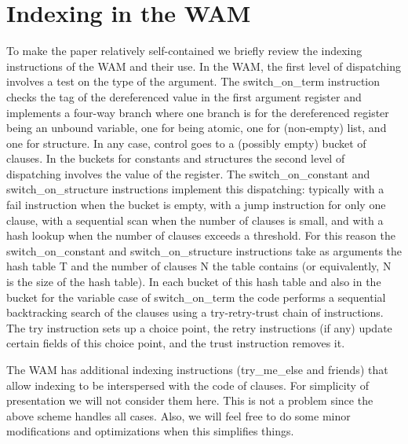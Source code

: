 \documentclass{llncs}
\newcommand{\instr}[1]{\textsf{#1}}
\newcommand{\try}{\instr{try}\xspace}
\newcommand{\retry}{\mbox{\instr{retry}}\xspace}
\newcommand{\trust}{\instr{trust}\xspace}
\newcommand{\TryRetryTrust}{\mbox{\instr{try-retry-trust}}\xspace}
\newcommand{\fail}{\instr{fail}\xspace}
\newcommand{\jump}{\instr{jump}\xspace}
\newcommand{\switchONterm}{\mbox{\instr{switch\_on\_term}}\xspace}
\newcommand{\switchONconstant}{\mbox{\instr{switch\_on\_constant}}\xspace}
\newcommand{\switchONstructure}{\mbox{\instr{switch\_on\_structure}}\xspace}
\begin{document}
\section{Indexing in the WAM} \label{sec:prelims}
To make the paper relatively self-contained we briefly review the
indexing instructions of the WAM and their use. In the WAM, the first
level of dispatching involves a test on the type of the argument. The
\switchONterm instruction checks the tag of the dereferenced value in
the first argument register and implements a four-way branch where one
branch is for the dereferenced register being an unbound variable, one
for being atomic, one for (non-empty) list, and one for structure. In
any case, control goes to a (possibly empty) bucket of clauses. In the
buckets for constants and structures the second level of dispatching
involves the value of the register. The \switchONconstant and
\switchONstructure instructions implement this dispatching: typically
with a \fail instruction when the bucket is empty, with a \jump
instruction for only one clause, with a sequential scan when the
number of clauses is small, and with a hash lookup when the number of
clauses exceeds a threshold. For this reason the \switchONconstant and
\switchONstructure instructions take as arguments the hash table
\instr{T} and the number of clauses \instr{N} the table contains (or
equivalently, \instr{N} is the size of the hash table). In each bucket
of this hash table and also in the bucket for the variable case of
\switchONterm the code performs a sequential backtracking search of
the clauses using a \TryRetryTrust chain of instructions. The \try
instruction sets up a choice point, the \retry instructions (if any)
update certain fields of this choice point, and the \trust instruction
removes it.

The WAM has additional indexing instructions (\instr{try\_me\_else}
and friends) that allow indexing to be interspersed with the code of
clauses. For simplicity of presentation we will not consider them
here. This is not a problem since the above scheme handles all cases.
Also, we will feel free to do some minor modifications and
optimizations when this simplifies things.
\end{document}
